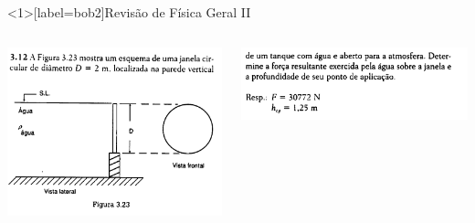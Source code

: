 \documentclass[t,%
brazilian,%
11pt,%
aspectratio=169,%
table%
]{beamer}
\begin{document}
 \begin{frame}<1>[label=bob2]{Revisão de Física Geral II}
     \begin{columns}[T]
         \begin{column}{0.5\textwidth}
             \includegraphics[width=\textwidth]{images/Captura de tela de 2025-04-02 16-55-06.png}
         \end{column}

         \begin{column}{0.4\textwidth}
             \includegraphics[width=\textwidth]{images/Captura de tela de 2025-04-02 16-55-20.png}
         \end{column}
     \end{columns}
 \end{frame}
\end{document}

